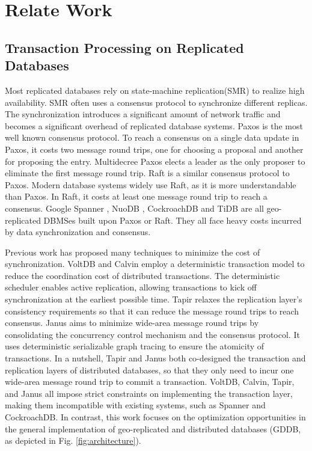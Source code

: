 \documentclass[conference]{IEEEtran}
\begin{document}
\section{Relate Work}
\label{sec:relate_work}

\subsection{Transaction Processing on Replicated Databases}


Most replicated databases rely on state-machine replication(SMR) to realize high availability.
SMR often uses a consensus protocol to synchronize different replicas.
The synchronization introduces a significant amount of network traffic and becomes a significant overhead of replicated database systems.
Paxos \cite{Paxos:journals/tocs/Lamport98}\cite{PaxosSimple:conf/opodis/Lamport02} is the most well known consensus protocol.
To reach a consensus on a single data update in Paxos, it costs two message round trips, one for choosing a proposal and another for proposing the entry.
Multidecree Paxos\cite{Multidecree:journals/csur/RenesseA15} elects a leader as the only proposer to eliminate the first message round trip.
Raft\cite{Raft:conf/usenix/OngaroO14} is a similar consensus protocol to Paxos.
Modern database systems widely use Raft, as it is more understandable than Paxos.
In Raft, it costs at least one message round trip to reach a consensus.
Google Spanner \cite{Spanner:conf/osdi/CorbettDEFFFGGHHHKKLLMMNQRRSSTWW12}\cite{Spanner:conf/sigmod/BaconBBCDFFGJKL17},
NuoDB \cite{NuoDB}, CockroachDB \cite{CockroachDB} and TiDB \cite{TiDB} are all geo-replicated DBMSes built upon Paxos or Raft.
They all face heavy costs incurred by data synchronization and consensus.

Previous work has proposed many techniques
to minimize the cost of synchronization.
VoltDB \cite{VoltDB} and Calvin \cite{Calvin:conf/sigmod/ThomsonDWRSA12} employ a deterministic transaction model
to reduce the coordination cost of distributed transactions.
The deterministic scheduler enables active replication, allowing transactions to kick off synchronization at the earliest possible time.
Tapir \cite{Tapir:conf/sosp/ZhangSSKP15} relaxes the replication layer's consistency requirements so that it can reduce the message round trips to reach consensus.
Janus \cite{Janus:conf/osdi/MuNLL16} aims to minimize wide-area message round trips
by consolidating the concurrency control mechanism and the consensus protocol.
It uses deterministic serializable graph tracing to ensure the atomicity of transactions.
In a nutshell, Tapir and Janus both co-designed the transaction and replication layers of distributed databases, so that they only need to incur one wide-area message round trip to commit a transaction.
VoltDB, Calvin, Tapir, and Janus all impose strict constraints on implementing the transaction layer, making them incompatible with existing systems, such as Spanner and CockroachDB.
In contrast, this work focuses on the optimization opportunities in the general implementation of geo-replicated and distributed databases (GDDB, as depicted in Fig.    \ref{fig:architecture}).
\end{document}
